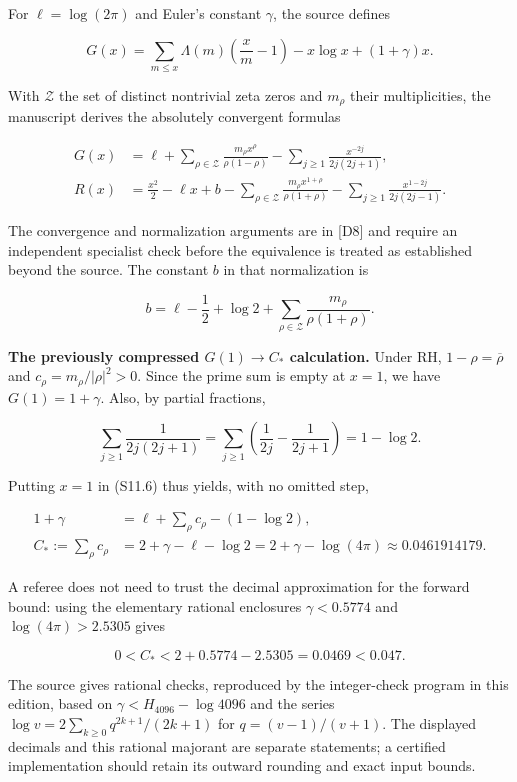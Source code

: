 \documentclass[
  10pt,
  a4paper,
  10pt,
  oneside,
  openany]{book}
\begin{document}
For \(\ell=\log(2\pi)\) and Euler's constant \(\gamma\), the source
defines

\[
G(x)=\sum_{m\le x}\Lambda(m)\left(\frac{x}{m}-1\right)
       -x\log x+(1+\gamma)x.
\tag{S11.5}\label{eq:S11.5}
\]

With \(\mathcal Z\) the set of distinct nontrivial zeta zeros and
\(m_\rho\) their multiplicities, the manuscript derives the absolutely
convergent formulas

\[
\begin{aligned}
G(x)&=\ell+\sum_{\rho\in\mathcal Z}
 \frac{m_\rho x^\rho}{\rho(1-\rho)}
 -\sum_{j\ge1}\frac{x^{-2j}}{2j(2j+1)},\\[2pt]
R(x)&=\frac{x^2}{2}-\ell x+b
 -\sum_{\rho\in\mathcal Z}\frac{m_\rho x^{1+\rho}}{\rho(1+\rho)}
 -\sum_{j\ge1}\frac{x^{1-2j}}{2j(2j-1)}.
\end{aligned}
\tag{S11.6}\label{eq:S11.6}
\]

The convergence and normalization arguments are in {[}D8{]} and require
an independent specialist check before the equivalence is treated as
established beyond the source. The constant \(b\) in that normalization
is

\[
b=\ell-\frac12+\log2+
\sum_{\rho\in\mathcal Z}\frac{m_\rho}{\rho(1+\rho)}.
\tag{S11.7}\label{eq:S11.7}
\]

\textbf{The previously compressed \(G(1)\to C_*\) calculation.} Under
RH, \(1-\rho=\overline\rho\) and \(c_\rho=m_\rho/|\rho|^2>0\). Since the
prime sum is empty at \(x=1\), we have \(G(1)=1+\gamma\). Also, by
partial fractions,

\[
\sum_{j\ge1}\frac1{2j(2j+1)}
=\sum_{j\ge1}\left(\frac1{2j}-\frac1{2j+1}\right)
=1-\log2.
\]

Putting \(x=1\) in (S11.6) thus yields, with no omitted step,

\[
\begin{aligned}
1+\gamma
 &=\ell+\sum_\rho c_\rho-(1-\log2),\\
C_*:=\sum_\rho c_\rho
 &=2+\gamma-\ell-\log2
 =2+\gamma-\log(4\pi)
 \approx0.0461914179.
\end{aligned}
\tag{S11.8}\label{eq:S11.8}
\]

A referee does not need to trust the decimal approximation for the
forward bound: using the elementary rational enclosures
\(\gamma<0.5774\) and \(\log(4\pi)>2.5305\) gives

\[
0<C_*<2+0.5774-2.5305=0.0469<0.047.
\tag{S11.9}\label{eq:S11.9}
\]

The source gives rational checks, reproduced by the integer-check
program in this edition, based on \(\gamma<H_{4096}-\log4096\) and the
series \(\log v=2\sum_{k\ge0}q^{2k+1}/(2k+1)\) for \(q=(v-1)/(v+1)\).
The displayed decimals and this rational majorant are separate
statements; a certified implementation should retain its outward
rounding and exact input bounds.
\end{document}
